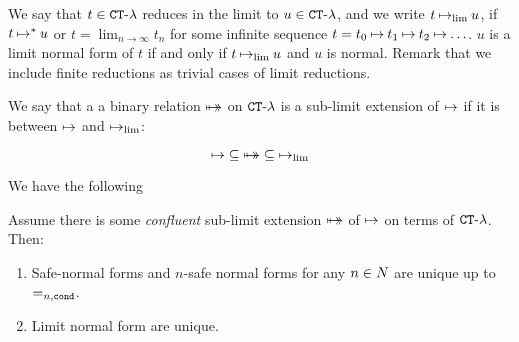 We say that $t \in { {\tt CT} \mbox{-} \lambda}$ reduces in the limit to $u \in { {\tt CT} \mbox{-} \lambda}$, and we write 
$t \mathbin{\mapsto}_{\lim} u$, if $t \mathbin{\mapsto}^* u$ 
or $t = \lim_{n \rightarrow \infty} t_n$ for some infinite sequence $t = t_0 \mathbin{\mapsto} t_1 \mathbin{\mapsto} t_2
\mathbin{\mapsto} \ldots$. $u$ is a limit normal form of $t$ if and only if $t \mathbin{\mapsto}_{\lim} u$ and $u$ is normal.
Remark that we include finite reductions as trivial cases of limit reductions.

We say that a a binary relation ${\mapsto\!\!\!\!\! \mapsto}$ on ${ {\tt CT} \mbox{-} \lambda}$ 
is a sub-limit extension of $\mathbin{\mapsto}$ if it is between $\mathbin{\mapsto}$ and $\mathbin{\mapsto}_{\lim}$:

$$
\mathbin{\mapsto} \subseteq {\mapsto\!\!\!\!\! \mapsto} \subseteq \mathbin{\mapsto}_{\lim}
$$ 

We have the following
 
\begin{lemma}
Assume there is some \emph{confluent} sub-limit extension ${\mapsto\!\!\!\!\! \mapsto}$
of $\mathbin{\mapsto}$ on terms of ${ {\tt CT} \mbox{-} \lambda}$.
Then: 
\begin{enumerate}
\item
Safe-normal forms and $n$-safe normal forms for any $n \in {N}$ are unique up to $=_{n,{\tt cond}}$.
\item
Limit normal form are unique.
\end{enumerate}
\end{lemma}

